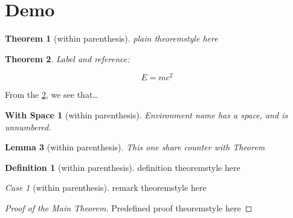 \theoremstyle{plain}
\newtheorem{Theorem}{Theorem}[chapter]
\newtheorem{Lemma}[Theorem]{Lemma}
\newtheorem{Corollary}[Theorem]{Corollary}
\newtheorem*{With Space}{With Space}
\newtheorem{Proposition}{Proposition}[chapter]
\newtheorem{Conjecture}[Proposition]{Conjecture}
\newtheorem{WithoutSpace}{WithoutSpace}[chapter]
\theoremstyle{definition}
\newtheorem{Definition}{Definition}[chapter]
\theoremstyle{remark}
\newtheorem{Case}{Case}[chapter]

\hypertarget{demo}{%
\section{Demo}\label{demo}}

\begin{Theorem}[within parenthesis]
plain theoremstyle here
\end{Theorem}

\begin{Theorem}\label{simplestEquation}
\leavevmode{}%
Label and reference:

\[E=mc^2\]
\end{Theorem}

From the \ref{simplestEquation}, we see that\ldots{}

\begin{With Space}[within parenthesis]
Environment name has a space, and is unnumbered.
\end{With Space}

\begin{Lemma}[within parenthesis]
This one share counter with Theorem
\end{Lemma}

\begin{Definition}[within parenthesis]
definition theoremstyle here
\end{Definition}

\begin{Case}[within parenthesis]
remark theoremstyle here
\end{Case}

\begin{proof}[Proof of the Main Theorem]
Predefined proof theoremstyle here
\end{proof}
